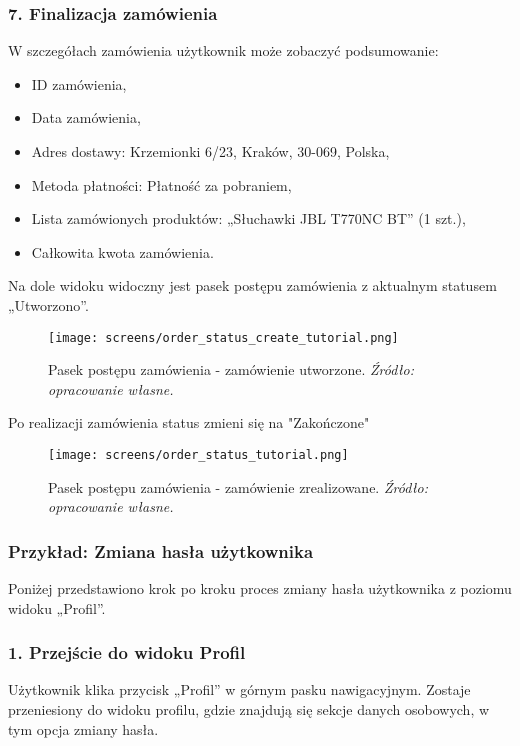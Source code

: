 \documentclass[12pt,a4paper,oneside]{article}
\theoremstyle{definition}
\numberwithin{equation}{section}
\begin{document}
\subsubsection*{\textbf{7. Finalizacja zamówienia}}
W szczegółach zamówienia użytkownik może zobaczyć podsumowanie:
\begin{itemize}
    \item ID zamówienia,
    \item Data zamówienia,
    \item Adres dostawy: Krzemionki 6/23, Kraków, 30-069, Polska,
    \item Metoda płatności: Płatność za pobraniem,
    \item Lista zamówionych produktów: „Słuchawki JBL T770NC BT” (1 szt.),
    \item Całkowita kwota zamówienia.
\end{itemize}
Na dole widoku widoczny jest pasek postępu zamówienia z aktualnym statusem „Utworzono”.

\begin{figure}[H]
    \centering
    \texttt{[image: screens/order\_status\_create\_tutorial.png]}
    \caption{Pasek postępu zamówienia - zamówienie utworzone. \emph{Źródło: opracowanie własne.}}
    \label{fig:order_status_create_tutorial}
\end{figure}
\newpage
Po realizacji zamówienia status zmieni się na "Zakończone"

\begin{figure}[H]
    \centering
    \texttt{[image: screens/order\_status\_tutorial.png]}
    \caption{Pasek postępu zamówienia - zamówienie zrealizowane. \emph{Źródło: opracowanie własne.}}
    \label{fig:order_status_tutorial}
\end{figure}


\subsubsection{Przykład: Zmiana hasła użytkownika}
Poniżej przedstawiono krok po kroku proces zmiany hasła użytkownika z poziomu widoku „Profil”.

\subsubsection*{\textbf{1. Przejście do widoku Profil}}
Użytkownik klika przycisk „Profil” w górnym pasku nawigacyjnym. Zostaje przeniesiony do widoku profilu, gdzie znajdują się sekcje danych osobowych, w tym opcja zmiany hasła.
\end{document}
